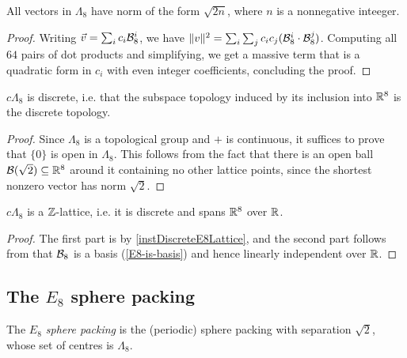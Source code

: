 \begin{lemma}\label{E8-vector-norms}\leanok
  All vectors in $\Lambda_8$ have norm of the form $\sqrt{2n}$, where $n$ is a nonnegative inteeger.
\end{lemma}
\begin{proof}
  Writing $\vec{v} = \sum_i c_i\mathcal{B}_8^i$, we have $\|v\|^2 = \sum_i \sum_j c_ic_j (\mathcal{B}_8^i \cdot \mathcal{B}_8^j)$. Computing all $64$ pairs of dot products and simplifying, we get a massive term that is a quadratic form in $c_i$ with even integer coefficients, concluding the proof.
\end{proof}

\begin{lemma}\label{instDiscreteE8Lattice}\leanok
  $c\Lambda_8$ is discrete, i.e. that the subspace topology induced by its inclusion into $\mathbb{R}^8$ is the discrete topology.
\end{lemma}
\begin{proof}
  Since $\Lambda_8$ is a topological group and $+$ is continuous, it suffices to prove that $\{0\}$ is open in $\Lambda_8$. This follows from the fact that there is an open ball $\mathcal{B}(\sqrt{2}) \subseteq \mathbb{R}^8$ around it containing no other lattice points, since the shortest nonzero vector has norm $\sqrt{2}$.
\end{proof}

\begin{lemma}\label{instLatticeE8}\leanok
  $c\Lambda_8$ is a $\mathbb{Z}$-lattice, i.e. it is discrete and spans $\mathbb{R}^8$ over $\mathbb{R}$.
\end{lemma}
\begin{proof}
  The first part is by \cref{instDiscreteE8Lattice}, and the second part follows from that $\mathcal{B}_8$ is a basis (\cref{E8-is-basis}) and hence linearly independent over $\mathbb{R}$.
\end{proof}


\subsection{The $E_8$ sphere packing}

\begin{definition}\label{E8Packing}\leanok
  The \emph{$E_8$ sphere packing} is the (periodic) sphere packing with separation $\sqrt{2}$, whose set of centres is $\Lambda_8$.
\end{definition}

